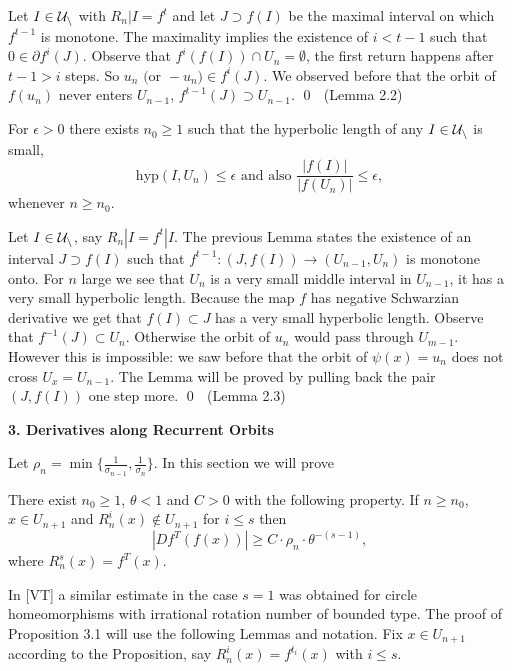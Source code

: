 Let $I\in \Cal{U}_n$ with $R_n|I=f^t$ and let 
$J\supset f(I)$ be the maximal interval
on which $f^{t-1}$ is monotone. The maximality implies the existence of $i<t-1$
such that $0\in \partial f^i(J)$. Observe that $f^i(f(I))\cap U_n=\emptyset$,
the first return happens after $t-1>i$ steps. 
So $u_n \text{ (or } -u_n\text{)}\in
f^i(J)$. We observed before that the orbit of $f(u_n)$ never enters $U_{n-1}$,
$f^{t-1}(J)\supset U_{n-1}$.
\hfill\hfill\qed $\,\,$ (Lemma 2.2)
\enddemo

 For $\epsilon>0$ there exists $n_0\ge 1$ such that 
the hyperbolic length of any $I\in\Cal{U}_n$ is small,
$$
\text{hyp}(I,U_n)\le \epsilon \text{ and also } 
\frac{|f(I)|}{|f(U_n)|}\le \epsilon,
$$
whenever $n\ge n_0$.
\endproclaim

 Let $I\in \Cal{U}_n$, say $R_n|I=f^t|I$. 
The previous Lemma states the existence of an interval $J\supset f(I)$ 
such that $f^{t-1}:(J,f(I))\to (U_{n-1},U_n)$ is monotone onto. For $n$ large
we see that $U_n$ is a very small middle interval in $U_{n-1}$, it has a very
small hyperbolic length. Because the map $f$ has negative Schwarzian
derivative we get that $f(I)\subset J$ has a very small hyperbolic length.
Observe that $f^{-1}(J)\subset U_n$. Otherwise the orbit of $u_n$ would pass 
through $U_{m-1}$. However this is impossible: we saw before that the orbit 
of $\psi(x)=u_n$ does not cross $U_x=U_{n-1}$.
The Lemma will be proved by pulling back the pair $(J,f(I))$ one step more.
\hfill\hfill\qed $\,\,$ (Lemma 2.3)
\enddemo







\bigskip
\centerline{\bf 3. Derivatives along Recurrent  Orbits}
\bigskip

\flushpar
Let $\rho_n=\min\{\frac{1}{\sigma_{n-1}},\frac{1}{\sigma_n}\}$.
In this section we will prove 

 There exist  $n_0\ge 1$, $\theta<1$ and $C>0$ with 
the following property. If $n\ge n_0$, 
$x\in U_{n+1}$ and $R_n^i(x)\notin U_{n+1}$ for $i\le s$
then
$$
|Df^T(f(x))|\ge C\cdot \rho_n \cdot \theta^{-(s-1)},
$$
where $R^s_n(x)=f^T(x)$.
\endproclaim

\flushpar
In [VT] a similar estimate in the case $s=1$ was obtained for circle 
homeomorphisms with irrational rotation number of bounded type.
The proof of Proposition 3.1 will use the following Lemmas 
and notation. Fix
$x\in U_{n+1}$ according to the Proposition, say $R_n^i(x)=f^{t_i}(x)$ with
$i\le s$.


